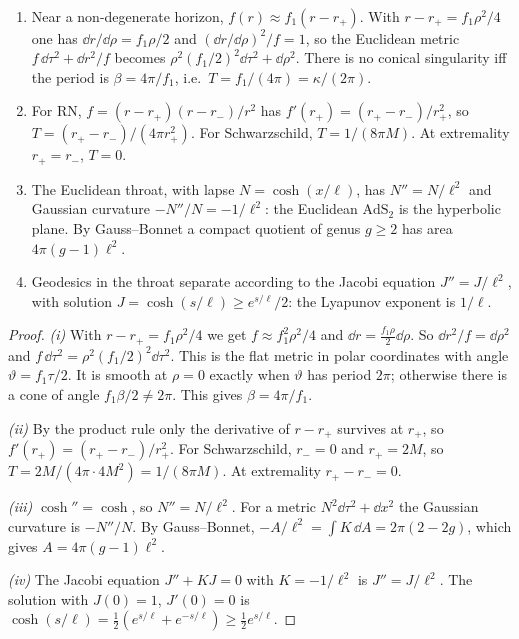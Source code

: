 \begin{theorem}\label{thm:hawkingT}\ver\
\begin{enumerate}[label=(\roman*)]
\item Near a non-degenerate horizon, $f(r)\approx f_1(r-r_+)$. With $r-r_+=f_1\rho^2/4$ one has $\dd r/\dd\rho=f_1\rho/2$ and $(\dd r/\dd\rho)^2/f=1$, so the Euclidean metric $f\,\dd\tau^2+\dd r^2/f$ becomes $\rho^2(f_1/2)^2\dd\tau^2+\dd\rho^2$. There is no conical singularity iff the period is $\beta=4\pi/f_1$, i.e.\ $T=f_1/(4\pi)=\kappa/(2\pi)$.
\item For RN, $f=(r-r_+)(r-r_-)/r^2$ has $f'(r_+)=(r_+-r_-)/r_+^2$, so $T=(r_+-r_-)/(4\pi r_+^2)$. For Schwarzschild, $T=1/(8\pi M)$. At extremality $r_+=r_-$, $T=0$.
\item The Euclidean throat, with lapse $N=\cosh(x/\ell)$, has $N''=N/\ell^2$ and Gaussian curvature $-N''/N=-1/\ell^2$: the Euclidean $\mathrm{AdS}_2$ is the hyperbolic plane. By Gauss--Bonnet a compact quotient of genus $g\ge2$ has area $4\pi(g-1)\ell^2$.
\item Geodesics in the throat separate according to the Jacobi equation $J''=J/\ell^2$, with solution $J=\cosh(s/\ell)\ge e^{s/\ell}/2$: the Lyapunov exponent is $1/\ell$.
\end{enumerate}
\end{theorem}
\begin{proof}
\emph{(i)} With $r-r_+=f_1\rho^2/4$ we get $f\approx f_1^2\rho^2/4$ and $\dd r=\frac{f_1\rho}2\dd\rho$. So $\dd r^2/f=\dd\rho^2$ and $f\,\dd\tau^2=\rho^2(f_1/2)^2\dd\tau^2$. This is the flat metric in polar coordinates with angle $\vartheta=f_1\tau/2$. It is smooth at $\rho=0$ exactly when $\vartheta$ has period $2\pi$; otherwise there is a cone of angle $f_1\beta/2\ne2\pi$. This gives $\beta=4\pi/f_1$.

\emph{(ii)} By the product rule only the derivative of $r-r_+$ survives at $r_+$, so $f'(r_+)=(r_+-r_-)/r_+^2$. For Schwarzschild, $r_-=0$ and $r_+=2M$, so $T=2M/(4\pi\cdot4M^2)=1/(8\pi M)$. At extremality $r_+-r_-=0$.

\emph{(iii)} $\cosh''=\cosh$, so $N''=N/\ell^2$. For a metric $N^2\dd\tau^2+\dd x^2$ the Gaussian curvature is $-N''/N$. By Gauss--Bonnet, $-A/\ell^2=\int K\,\dd A=2\pi(2-2g)$, which gives $A=4\pi(g-1)\ell^2$.

\emph{(iv)} The Jacobi equation $J''+KJ=0$ with $K=-1/\ell^2$ is $J''=J/\ell^2$. The solution with $J(0)=1$, $J'(0)=0$ is $\cosh(s/\ell)=\frac12(e^{s/\ell}+e^{-s/\ell})\ge\frac12e^{s/\ell}$.
\end{proof}


